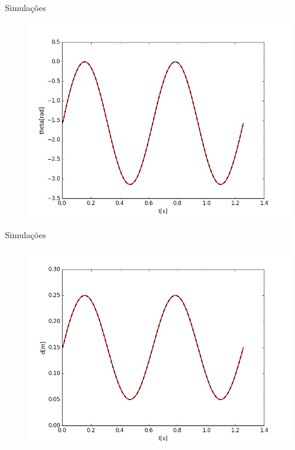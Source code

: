 \documentclass[25pt,landscape]{beamer}
\begin{document}
\begin{frame}{Simula\c{c}\~oes}
	\begin{figure}[!h]
        \centering
        \includegraphics[scale=0.45]{Python/theta.png}
    \end{figure}
\end{frame}

\begin{frame}{Simula\c{c}\~oes}
	\begin{figure}[!h]
        \centering
        \includegraphics[scale=0.45]{Python/d.png}
    \end{figure}
\end{frame}
\end{document}
